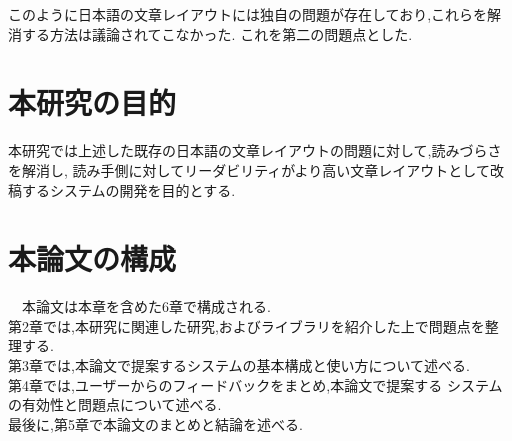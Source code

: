 このように日本語の文章レイアウトには独自の問題が存在しており,これらを解消する方法は議論されてこなかった.
これを第二の問題点とした.

\section{本研究の目的}
本研究では上述した既存の日本語の文章レイアウトの問題に対して,読みづらさを解消し,
読み手側に対してリーダビリティがより高い文章レイアウトとして改稿するシステムの開発を目的とする.

\section{本論文の構成}
 本論⽂は本章を含めた6章で構成される.
 \\第2章では,本研究に関連した研究,およびライブラリを紹介した上で問題点を整理する.
 \\第3章では,本論⽂で提案するシステムの基本構成と使い⽅について述べる.
 \\第4章では,ユーザーからのフィードバックをまとめ,本論⽂で提案する
システムの有効性と問題点について述べる.
 \\最後に,第5章で本論⽂のまとめと結論を述べる.